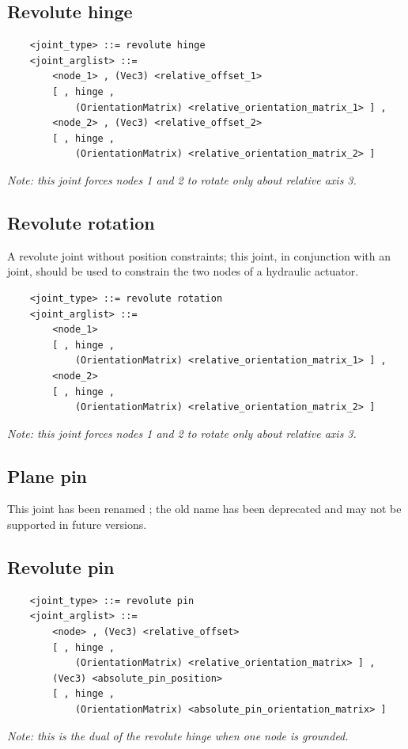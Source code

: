 \subsection{Revolute hinge}
\begin{verbatim}
    <joint_type> ::= revolute hinge
    <joint_arglist> ::= 
        <node_1> , (Vec3) <relative_offset_1> 
        [ , hinge , 
            (OrientationMatrix) <relative_orientation_matrix_1> ] ,
        <node_2> , (Vec3) <relative_offset_2>
        [ , hinge , 
            (OrientationMatrix) <relative_orientation_matrix_2> ]
\end{verbatim}
{\em
    Note: this joint forces nodes 1 and 2 to rotate only about relative 
    axis 3.
}

\subsection{Revolute rotation}
A revolute joint without position constraints; this joint, in conjunction
with an  joint, should be used to constrain the two nodes
of a hydraulic actuator.
\begin{verbatim}
    <joint_type> ::= revolute rotation
    <joint_arglist> ::= 
        <node_1>
        [ , hinge , 
            (OrientationMatrix) <relative_orientation_matrix_1> ] ,
        <node_2>
        [ , hinge , 
            (OrientationMatrix) <relative_orientation_matrix_2> ]
\end{verbatim}
{\em
    Note: this joint forces nodes 1 and 2 to rotate only about relative 
    axis 3.
}

\subsection{Plane pin}
This joint has been renamed ; the old name has been
deprecated and may not be supported in future versions.

\subsection{Revolute pin}
\begin{verbatim}
    <joint_type> ::= revolute pin
    <joint_arglist> ::= 
        <node> , (Vec3) <relative_offset>
        [ , hinge , 
            (OrientationMatrix) <relative_orientation_matrix> ] ,
        (Vec3) <absolute_pin_position>
        [ , hinge , 
            (OrientationMatrix) <absolute_pin_orientation_matrix> ]
\end{verbatim}
{\em
    Note: this is the dual of the revolute hinge when one node is grounded.
}

